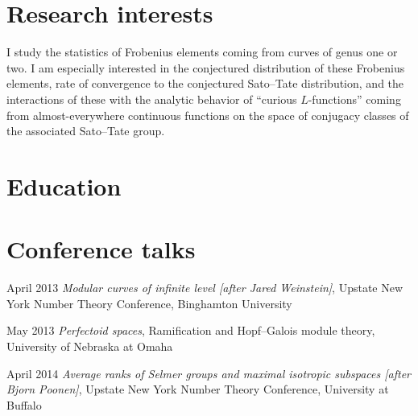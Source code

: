\documentclass[11pt,a4paper]{moderncv}
\begin{document}
\makecvtitle





\section{Research interests}

I study the statistics of Frobenius elements coming from curves of genus one or 
two. I am especially interested in the conjectured distribution of these 
Frobenius elements, rate of convergence to the conjectured Sato--Tate 
distribution, and the interactions of these with the analytic behavior of 
``curious $L$-functions'' coming from almost-everywhere continuous functions 
on the space of conjugacy classes of the associated Sato--Tate group. 





\section{Education}







\nocite{*}







\section{Conference talks}

\cvline
  {April 2013}
  {\emph{Modular curves of infinite level [after Jared Weinstein]},
  Upstate New York Number Theory Conference,
  Binghamton University}
  
\cvline
  {May 2013}
  {\emph{Perfectoid spaces},
  Ramification and Hopf--Galois module theory,
  University of Nebraska at Omaha}
  
\cvline
  {April 2014}
  {\emph{Average ranks of Selmer groups and maximal isotropic subspaces [after Bjorn Poonen]},
  Upstate New York Number Theory Conference,
  University at Buffalo}
  
\end{document}
